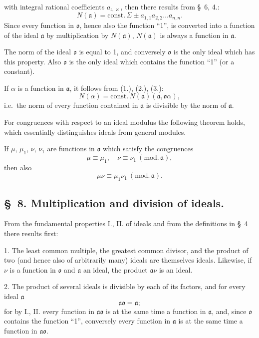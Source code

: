 \documentclass{article}
\begin{document}
with integral rational coefficients $a_{\iota,\varkappa}$, then there results from §~6, 4.:
\[ N(\mathfrak{a}) = \text{const.}\,\Sigma \pm a_{1,1}a_{2,2}\ldots a_{n,n}. \tag{3.} \]
Since every function in $\mathfrak{o}$, hence also the function ``1'', is converted into a function of the ideal $\mathfrak{a}$ by multiplication by $N(\mathfrak{a})$, $N(\mathfrak{a})$ is always a function in $\mathfrak{a}$.

The norm of the ideal $\mathfrak{o}$ is equal to 1, and conversely $\mathfrak{o}$ is the only ideal which has this property. Also $\mathfrak{o}$ is the only ideal which contains the function ``1'' (or a constant).

If $\alpha$ is a function in $\mathfrak{a}$, it follows from (1.), (2.), (3.):
\[ N(\alpha) = \text{const.}\,N(\mathfrak{a})(\mathfrak{a}, \mathfrak{o}\alpha), \tag{4.} \]
i.e.\ the norm of every function contained in $\mathfrak{a}$ is divisible by the norm of $\mathfrak{a}$.

For congruences with respect to an ideal modulus the following theorem holds, which essentially distinguishes ideals from general modules.

If $\mu$, $\mu_{1}$, $\nu$, $\nu_{1}$ are functions in $\mathfrak{o}$ which satisfy the congruences
\[ \mu \equiv \mu_{1}, \quad \nu \equiv \nu_{1} \ (\text{mod.}\,\mathfrak{a}), \]
then also
\[ \mu\nu \equiv \mu_{1}\nu_{1} \ (\text{mod.}\,\mathfrak{a}). \]

\subsection*{§~8. Multiplication and division of ideals.}

From the fundamental properties I., II. of ideals and from the definitions in §~4 there results first:

1. The least common multiple, the greatest common divisor, and the product of two (and hence also of arbitrarily many) ideals are themselves ideals. Likewise, if $\nu$ is a function in $\mathfrak{o}$ and $\mathfrak{a}$ an ideal, the product $\mathfrak{a}\nu$ is an ideal.

2. The product of several ideals is divisible by each of its factors, and for every ideal $\mathfrak{a}$
\[ \mathfrak{a}\mathfrak{o} = \mathfrak{a}; \]
for by I., II. every function in $\mathfrak{a}\mathfrak{o}$ is at the same time a function in $\mathfrak{a}$, and, since $\mathfrak{o}$ contains the function ``1'', conversely every function in $\mathfrak{a}$ is at the same time a function in $\mathfrak{a}\mathfrak{o}$.
\end{document}
